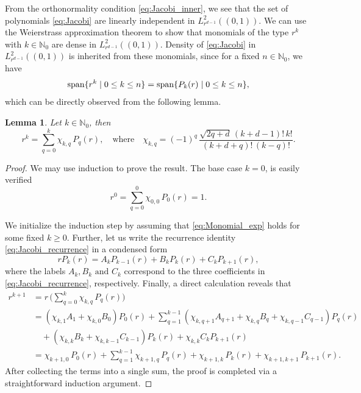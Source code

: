 \documentclass[reqno]{amsart}
\numberwithin{equation}{section}
\numberwithin{figure}{section}
\numberwithin{table}{section}
\theoremstyle{plain}
\newtheorem{lemma}[theorem]{Lemma}
\theoremstyle{definition}
\theoremstyle{remark}
\newcommand{\spanm}{\mathop{\textup{span}}}
\newcommand{\N}{\mathbb{N}}
\begin{document}
From the orthonormality condition \eqref{eq:Jacobi_inner}, we see that the set of polynomials \eqref{eq:Jacobi} are linearly independent in \( L^2_{r^{d-1}}((0,1)) \).
%
We can use the Weierstrass approximation theorem to show that monomials of the type \( r^k \) with \( k \in \N_0 \) are dense in \( L^2_{r^{d-1}}((0,1)) \).
%
Density of \eqref{eq:Jacobi} in \( L^2_{r^{d-1}}((0,1)) \) is inherited from these monomials, since for a fixed \( n \in \N_0 \), we have
%
\[ \spanm \{ r^k \mid 0 \leq k \leq n \} = \spanm \{ P_k(r) \mid 0 \leq k \leq n \}, \]
%
which can be directly observed from the following lemma.
%
\begin{lemma} \label{lemma:Jacobi}
    Let \( k \in \N_0 \), then
    \begin{equation} \label{eq:Monomial_exp}
        r^k = \sum^k_{q=0}  \chi_{k,q} \, P_q(r), \quad \text{where} \quad \chi_{k,q} = (-1)^q \, \frac{\sqrt{2q+d} \, (k + d - 1)! \, k!}{ (k + d + q)! \, (k - q)!}.
    \end{equation}
\end{lemma}
%
\begin{proof}
    We may use induction to prove the result.
    The base case \( k = 0 \), is easily verified
    \[ r^0 = \sum^0_{q=0} \chi_{0,0} \, P_0(r) = 1. \]


    We initialize the induction step by assuming that \eqref{eq:Monomial_exp} holds for some fixed \( k \geq 0 \).
    Further, let us write the recurrence identity \eqref{eq:Jacobi_recurrence} in a condensed form
    \[ rP_k(r) = A_k P_{k-1}(r) + B_k P_k(r) + C_k P_{k+1}(r), \]
    where the labels \( A_k, B_k \text{ and } C_k \) correspond to the three coefficients in \eqref{eq:Jacobi_recurrence}, respectively.
    Finally, a direct calculation reveals that
    \begin{align*}
        r^{k+1} &= r \, \Big( \sum^k_{q=0} \chi_{k,q} \, P_q(r) \Big) \\[-3mm]
        &= (\chi_{k,1} A_1 + \chi_{k,0} B_0) P_0(r) + \sum^{k-1}_{q=1} (\chi_{k,q+1} A_{q+1} + \chi_{k,q} B_q + \chi_{k,q-1} C_{q-1}) P_q(r) \\
        &\quad+ (\chi_{k,k} B_k + \chi_{k,k-1} C_{k-1} ) P_k(r) + \chi_{k,k} C_k P_{k+1}(r) \\
        &= \chi_{k+1,0} \, P_0(r) + \sum^{k-1}_{q=1} \chi_{k+1,q} \, P_q(r) + \chi_{k+1,k} \, P_k(r) + \chi_{k+1,k+1} \, P_{k+1}(r).
    \end{align*}
    After collecting the terms into a single sum, the proof is completed via a straightforward induction argument.
\end{proof}
%
\end{document}

